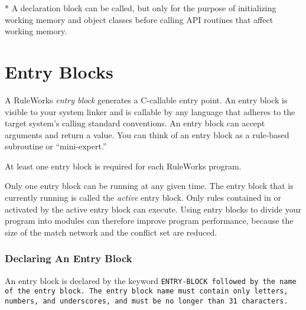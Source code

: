 * A declaration block can be called, but only for the purpose of
initializing working memory and object classes before calling API
routines that affect working memory.

\section{Entry Blocks}

A RuleWorks \emph{entry block} generates a C-callable entry point. An
entry block is visible to your system linker and is callable by any
language that adheres to the target system's calling standard
conventions. An entry block can accept arguments and return a
value. You can think of an entry block as a rule-based subroutine or
``mini-expert.''

At least one entry block is required for each RuleWorks program.

Only one entry block can be running at any given time. The entry block
that is currently running is called the \emph{active} entry
block. Only rules contained in or activated by the active entry block
can execute. Using entry blocks to divide your program into modules
can therefore improve program performance, because the size of the
match network and the conflict set are reduced.

\subsubsection{Declaring An Entry Block}

An entry block is declared by the keyword \tt{ENTRY-BLOCK} followed by
the name of the entry block. The entry block name must contain only
letters, numbers, and underscores, and must be no longer than 31
characters.

